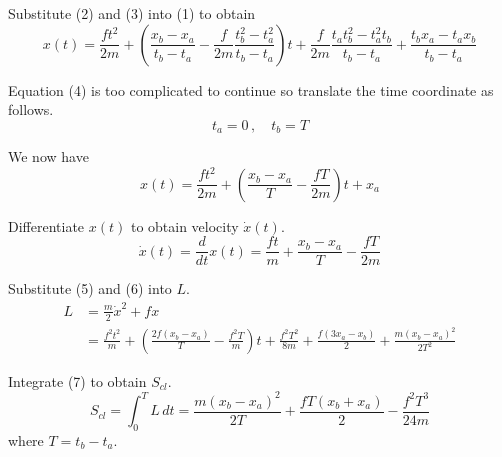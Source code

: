 Substitute (2) and (3) into (1) to obtain
\begin{equation*}
x(t)=
\frac{ft^2}{2m}
+\left(\frac{x_b-x_a}{t_b-t_a}-\frac{f}{2m}\frac{t_b^2-t_a^2}{t_b-t_a}\right)t
+\frac{f}{2m}\frac{t_a t_b^2 - t_a^2 t_b}{t_b - t_a} + \frac{t_b x_a - t_a x_b}{t_b - t_a}
\tag{4}
\end{equation*}

Equation (4) is too complicated to continue so translate the time coordinate as follows.
\begin{equation*}
t_a=0\,, %
\quad
t_b=T
\end{equation*}

We now have
\begin{equation*}
x(t)=\frac{ft^2}{2m}+\left(\frac{x_b-x_a}{T}-\frac{fT}{2m}\right)t+x_a
\tag{5}
\end{equation*}

Differentiate $x(t)$ to obtain velocity $\dot x(t)$.
\begin{equation*}
\dot x(t)=
\frac{d}{dt}x(t)=\frac{ft}{m}+\frac{x_b-x_a}{T}-\frac{fT}{2m}
\tag{6}
\end{equation*}

Substitute (5) and (6) into $L$.
\begin{align*}
L&=\frac{m}{2}\dot x^2+fx
\\[1ex]
&=\frac{f^2t^2}{m}
+\left(\frac{2f(x_b-x_a)}{T}-\frac{f^2T}{m}\right)t
+\frac{f^2T^2}{8m}
+\frac{f(3x_a-x_b)}{2}
+\frac{m(x_b-x_a)^2}{2T^2}
\tag{7}
\end{align*}

Integrate (7) to obtain $S_{cl}$.
\begin{equation*}
S_{cl}=\int_0^T L\,dt
=\frac{m(x_b-x_a)^2}{2T}+\frac{fT(x_b+x_a)}{2}-\frac{f^2T^3}{24m}
\tag{8}
\end{equation*}
where $T=t_b-t_a$.


